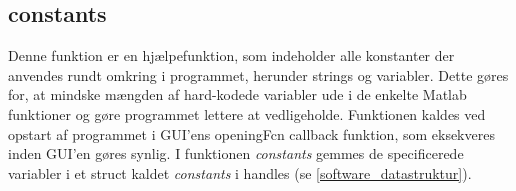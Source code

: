 \newpage
\subsection{constants}
Denne funktion er en hjælpefunktion, som indeholder alle konstanter der anvendes rundt omkring i programmet, herunder strings og variabler. Dette gøres for, at mindske mængden af hard-kodede variabler ude i de enkelte Matlab funktioner og gøre programmet lettere at vedligeholde. Funktionen kaldes ved opstart af programmet i GUI'ens openingFcn callback funktion, som eksekveres inden GUI'en gøres synlig. I funktionen \textit{constants} gemmes de specificerede variabler i et struct kaldet \textit{constants} i handles (se \ref{software_datastruktur}). 
